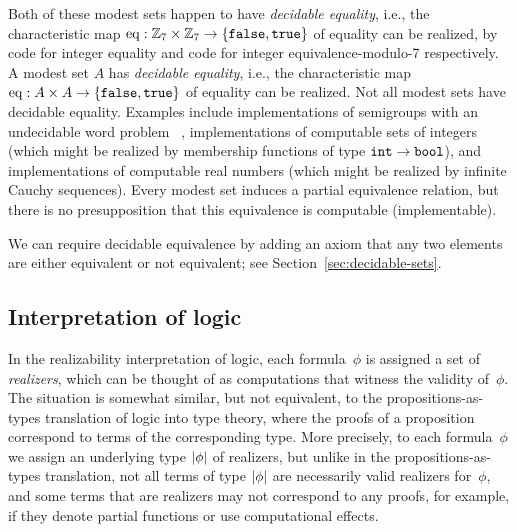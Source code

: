 Both of these modest sets happen to have \emph{decidable equality},
i.e., the characteristic map $\mathrm{eq} : \mathbb{Z}_7 \times
\mathbb{Z}_7 \to \{\mathtt{false}, \mathtt{true}\}$ of equality can be 
realized, by code for integer equality and code for integer equivalence-modulo-7
respectively.
\else
A modest set $A$ has \emph{decidable equality},
i.e., the characteristic map $\mathrm{eq} : A \times
A \to \{\mathtt{false}, \mathtt{true}\}$ of equality can be 
realized.
\fi %
%
Not all modest sets have decidable
equality.  Examples include implementations of semigroups with an undecidable word
problem~\cite{post47:_recur_unsol_probl_thue}%
\iflong
, implementations of computable sets of integers (which might be realized by
membership functions of type $\mathtt{int}\to\mathtt{bool}$),
\fi
and implementations of computable real numbers (which might be realized
by infinite Cauchy sequences).  Every modest set induces a partial equivalence relation, but there is no
presupposition that this equivalence is computable (implementable).

We can require decidable equivalence
by adding an axiom that any two elements are either equivalent
or not equivalent; see Section~\ref{sec:decidable-sets}.

\iflong\else\goodbreak\fi

\subsection{Interpretation of logic}
\label{sec:interpretation-logic}

In the realizability interpretation of logic, each formula~$\phi$ is
assigned a set of \emph{realizers}, which can be thought of as
computations that witness the validity of~$\phi$. The situation is
somewhat similar, but not equivalent, to the propositions-as-types
translation of logic into type theory, where the proofs of a
proposition correspond to terms of the corresponding type. More
precisely, to each formula~$\phi$ we assign an underlying type
$|\phi|$ of realizers, but unlike in the propositions-as-types
translation, not all terms of type $|\phi|$ are necessarily
valid realizers for~$\phi$, and some terms that are realizers may not
correspond to any proofs, for example, if they denote partial
functions or use computational effects.

